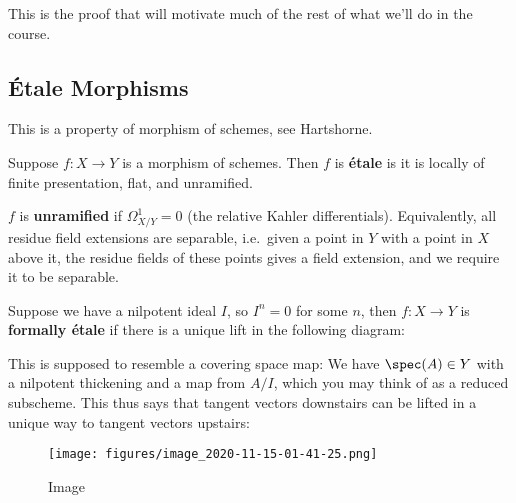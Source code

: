 This is the proof that will motivate much of the rest of what we'll do
in the course.

\hypertarget{uxe9tale-morphisms}{%
\subsection{Étale Morphisms}\label{uxe9tale-morphisms}}

This is a property of morphism of schemes, see Hartshorne.

\begin{definition}

Suppose \(f:X\to Y\) is a morphism of schemes. Then \(f\) is
\textbf{étale} is it is locally of finite presentation, flat, and
unramified.

\end{definition}

\begin{definition}[Unramified]

\(f\) is \textbf{unramified} if \(\Omega_{X/Y}^1 = 0\) (the relative
Kahler differentials). Equivalently, all residue field extensions are
separable, i.e.~given a point in \(Y\) with a point in \(X\) above it,
the residue fields of these points gives a field extension, and we
require it to be separable.

\end{definition}

\begin{definition}

Suppose we have a nilpotent ideal \(I\), so \(I^n = 0\) for some \(n\),
then \(f:X\to Y\) is \textbf{formally étale} if there is a unique lift
in the following diagram:

\begin{center}
\end{center}

\end{definition}

\begin{remark}

This is supposed to resemble a covering space map: We have
\(\spec(A) \in Y\) with a nilpotent thickening and a map from \(A/I\),
which you may think of as a reduced subscheme. This thus says that
tangent vectors downstairs can be lifted in a unique way to tangent
vectors upstairs:

\begin{figure}
\centering
\texttt{[image: figures/image\_2020-11-15-01-41-25.png]}
\caption{Image}
\end{figure}

\end{remark}

